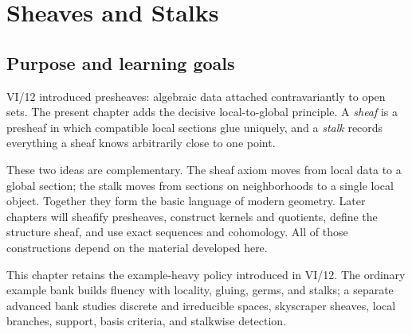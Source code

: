 
\chapter{Sheaves and Stalks}
\label{ch:sheaves-stalks}
\providecommand{\id}{\operatorname{id}}
\providecommand{\PreSh}{\mathbf{PreSh}}
\providecommand{\Sh}{\mathbf{Sh}}
\providecommand{\LocConst}{\mathcal{LC}}

\section*{Purpose and learning goals}

VI/12 introduced presheaves: algebraic data attached contravariantly to open sets.  The
present chapter adds the decisive local-to-global principle.  A \emph{sheaf} is a presheaf in
which compatible local sections glue uniquely, and a \emph{stalk} records everything a
sheaf knows arbitrarily close to one point.

These two ideas are complementary.  The sheaf axiom moves from local data to a global
section; the stalk moves from sections on neighborhoods to a single local object.  Together
they form the basic language of modern geometry.  Later chapters will sheafify presheaves,
construct kernels and quotients, define the structure sheaf, and use exact sequences and
cohomology.  All of those constructions depend on the material developed here.

This chapter retains the example-heavy policy introduced in VI/12.  The ordinary example
bank builds fluency with locality, gluing, germs, and stalks; a separate advanced bank
studies discrete and irreducible spaces, skyscraper sheaves, local branches, support,
basis criteria, and stalkwise detection.

